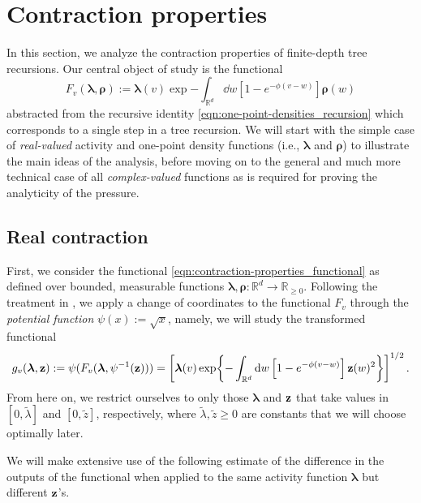 \documentclass[11pt]{article}
\newcommand{\R}{\mathbb R}
\newcommand{\bl}{\bm{\lambda}}
\newcommand{\br}{\bm{\rho}}
\newcommand{\bz}{\vb{z}}
\newcommand{\tl}{\tilde{\lambda}}
\newcommand{\tz}{\tilde{z}}
\numberwithin{equation}{section}
\theoremstyle{plain}
\theoremstyle{definition}
\theoremstyle{remark}
\begin{document}
\section{Contraction properties}
\label{sec:contraction-properties}

In this section, we analyze the contraction properties of finite-depth tree recursions.
Our central object of study is the functional 
\begin{equation}
\label{eqn:contraction-properties_functional}
F_{v}(\bl,\br):=\bl(v)\exp{-\int_{\R^{d}}\dd{w}\left[1-e^{-\phi(v-w)}\right]\br(w)}
\end{equation}
abstracted from the recursive identity \eqref{eqn:one-point-densities_recursion} which corresponds to a single step in a tree recursion.
We will start with the simple case of \emph{real-valued} activity and one-point density functions (i.e., $\bl$ and $\br$) to illustrate the main ideas of the analysis, before moving on to the general and much more technical case of all \emph{complex-valued} functions as is required for proving the analyticity of the pressure.



\subsection{Real contraction}
\label{sec:contraction-properties_real-contraction}

First, we consider the functional \eqref{eqn:contraction-properties_functional} as defined over bounded, measurable functions $\bl,\br:\R^{d}\rightarrow\R_{\ge 0}$.
Following the treatment in \cite[\S5.1]{michelen2023analyticity}, we apply a change of coordinates \cite{guo2018uniqueness,li2013correlation} to the functional $F_{v}$ through the \emph{potential function} $\psi(x):=\sqrt{x}$, namely, we will study the transformed functional
\begin{equation}
g_{v}(\bl,\bz)
:=\psi(F_{v}(\bl,\psi^{-1}(\bz)))
=\left[\bl(v)\exp{-\int_{\R^{d}}\dd{w}\left[1-e^{-\phi(v-w)}\right]\bz(w)^{2}}\right]^{1/2}.
\end{equation}
From here on, we restrict ourselves to only those $\bl$ and $\bz$ that take values in $[0,\tl]$ and $[0,\tz]$, respectively, where $\tilde{\lambda},\tilde{z}\ge0$ are constants that we will choose optimally later.

We will make extensive use of the following estimate of the difference in the outputs of the functional when applied to the same activity function $\bl$ but different $\bz$'s.
\end{document}
